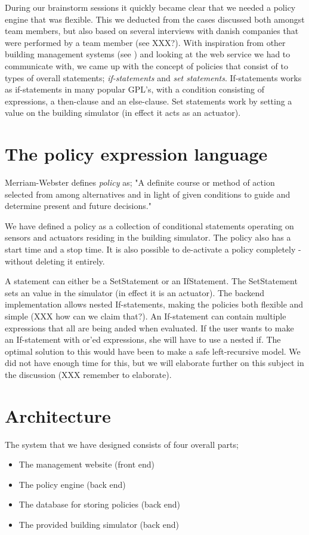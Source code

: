 During our brainstorm sessions it quickly became clear that we needed a policy engine that was flexible. This we deducted from the cases discussed both amongst team members, but also based on several interviews with danish companies that were performed by a team member (see XXX?). With inspiration from other building management systems (see ) and looking at the web service we had to communicate with, we came up with the concept of policies that consist of to types of overall statements; \textit{if-statements} and \textit{set statements}. If-statements works as if-statements in many popular GPL's, with a condition consisting of expressions, a then-clause and an else-clause. Set statements work by setting a value on the building simulator (in effect it acts as an actuator).


\section{The policy expression language}
Merriam-Webster defines \textit{policy} as; "A definite course or method of action selected from among alternatives and in light of given conditions to guide and determine present and future decisions."

We have defined a policy as a collection of conditional statements operating on sensors and actuators residing in the building simulator. The policy also has a start time and a stop time. It is also possible to de-activate a policy completely - without deleting it entirely.


A statement can either be a SetStatement or an IfStatement. The SetStatement sets an value in the simulator (in effect it is an actuator). The backend implementation allows nested If-statements, making the policies both flexible and simple (XXX how can we claim that?). An If-statement can contain multiple expressions that all are being anded when evaluated. If the user wants to make an If-statement with or'ed expressions, she will have to use a nested if. The optimal solution to this would have been to make a safe left-recursive model. We did not have enough time for this, but we will elaborate further on this subject in the discussion (XXX remember to elaborate). 

\section{Architecture}
The system that we have designed consists of four overall parts;
\begin{itemize}
	\item The management website (front end)
	\item The policy engine (back end)
	\item The database for storing policies (back end)
	\item The provided building simulator (back end)
\end{itemize}

